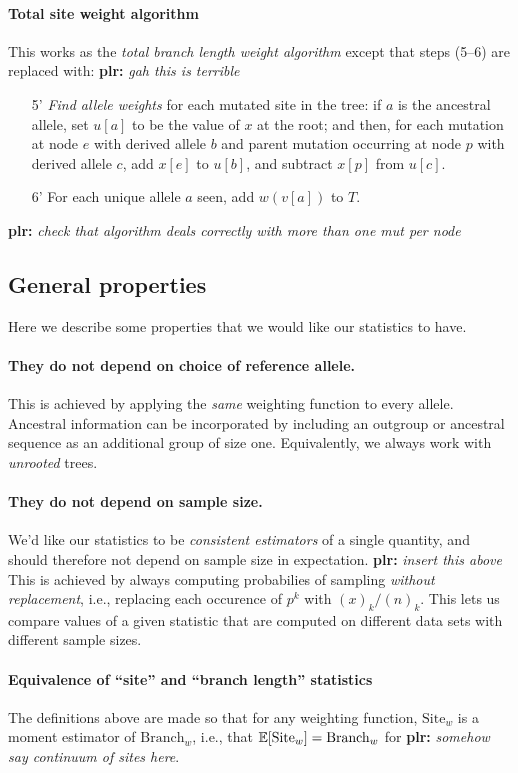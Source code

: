 \documentclass{article}
\newcommand{\branch}{\mbox{Branch}} %
\newcommand{\site}{\mbox{Site}} %
\newcommand{\plr}[1]{{\color{blue}\textbf{plr:} \it #1}}
\begin{document}
\paragraph{Total site weight algorithm}
This works as the \emph{total branch length weight algorithm} except that steps (5--6) are replaced with:
\plr{gah this is terrible}
\begin{itemize}
    \item[5'] \emph{Find allele weights} for each mutated site in the tree:
        if $a$ is the ancestral allele,
        set $u[a]$ to be the value of $x$ at the root; and then,
        for each mutation at node $e$ with derived allele $b$
        and parent mutation occurring at node $p$ with derived allele $c$,
        add $x[e]$ to $u[b]$, and subtract $x[p]$ from $u[c]$.
    \item[6'] For each unique allele $a$ seen,
        add $w(v[a])$ to $T$.
\end{itemize}
\plr{check that algorithm deals correctly with more than one mut per node}

\subsection*{General properties}

Here we describe some properties that we would like our statistics to have.

\paragraph{They do not depend on choice of reference allele.}
This is achieved by applying the \emph{same} weighting function to every allele.
Ancestral information can be incorporated by including an outgroup or ancestral sequence
as an additional group of size one.
Equivalently, we always work with \emph{unrooted} trees.

\paragraph{They do not depend on sample size.}
We'd like our statistics to be \emph{consistent estimators}
of a single quantity, and should therefore not depend on sample size in expectation.
\plr{insert this above}
This is achieved by always computing probabilies of sampling \emph{without replacement},
i.e., replacing each occurence of $p^k$ with $(x)_k/(n)_k$.
This lets us compare values of a given statistic
that are computed on different data sets with different sample sizes.

\paragraph{Equivalence of ``site'' and ``branch length'' statistics}
The definitions above are made so that for any weighting function,
$\site_w$ is a moment estimator of $\branch_w$, i.e.,
that $\E[\site_w] = \branch_w$ for \plr{somehow say continuum of sites here}.
\end{document}
